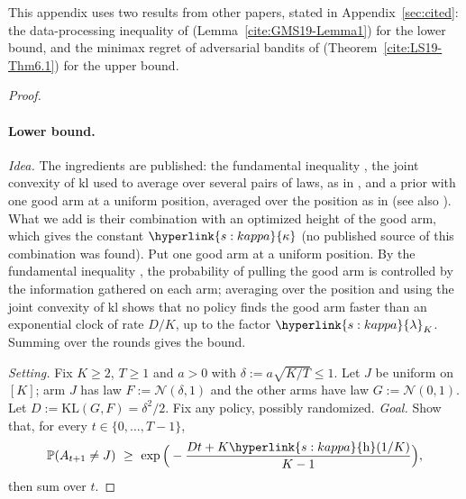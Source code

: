 \documentclass[11pt]{article}
\DeclareRobustCommand{\sy}[2]{{\hyperlink{#1}{#2}}}
\renewcommand{\P}{\mathbb{P}}
\newcommand{\1}{\mathbf{1}}
\newcommand{\kl}{\mathrm{kl}}
\newcommand{\KL}{\mathrm{KL}}
\newcommand{\kap}{\sy{s:kappa}{\kappa}}
\newcommand{\hb}{\sy{s:kappa}{\mathrm h}}
\newcommand{\lamK}{\sy{s:kappa}{\lambda}}
\begin{document}
\noindent This appendix uses two results from other papers, stated in Appendix~\ref{sec:cited}: the data-processing inequality of
\citet{GMS19} (Lemma~\ref{cite:GMS19-Lemma1}) for the lower bound, and the minimax regret of adversarial bandits of \citet{LS19}
(Theorem~\ref{cite:LS19-Thm6.1}) for the upper bound.

\begin{proof}
\paragraph{Lower bound.} \emph{Idea.} The ingredients are published: the fundamental inequality \citep[(6)]{GMS19}, the joint convexity of $\kl$ used
to average over several pairs of laws, as in \citet[Section~3, (4)--(5), with Corollary~3]{GMS20}, and a prior with one good arm at a uniform position, averaged over
the position as in \citet[Exercise~15.2]{LS} (see also \citealp{ACFS02}). What we add is their combination with an optimized height of the good arm, which gives the constant $\kap$
(no published source of this combination was found).
Put one good arm at a uniform position. By the fundamental inequality \citep[(6)]{GMS19}, the probability of pulling the good arm is
controlled by the information gathered on each arm; averaging over the position and using the joint convexity of $\kl$ shows that no policy finds the good arm faster
than an exponential clock of rate $D/K$, up to the factor $\lamK_K$. Summing over the rounds gives the bound.

\noindent\emph{Setting.} Fix $K\ge2$, $T\ge1$ and $a>0$ with $\delta:=a\sqrt{K/T}\le1$. Let $J$ be uniform on $[K]$; arm $J$ has law $F:=\mathcal N(\delta,1)$ and the other arms have law
$G:=\mathcal N(0,1)$. Let $D:=\KL(G,F)=\delta^2/2$. Fix any policy, possibly randomized. \emph{Goal.} Show that, for every $t\in\{0,\dots,T-1\}$,
\begin{equation}\label{eq:search}
\P(A_{t+1}\ne J)\ \ge\ \exp\Big(-\frac{Dt+K\hb(1/K)}{K-1}\Big),
\end{equation}
then sum over $t$.


\end{proof}
\end{document}
